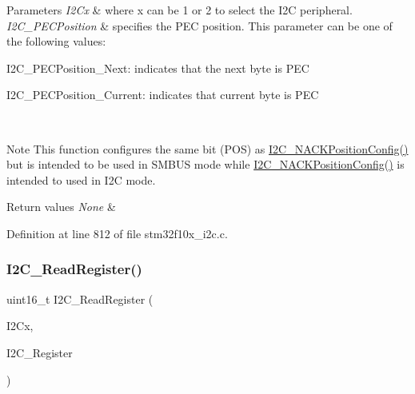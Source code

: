 \begin{DoxyParams}{Parameters}
{\em I2\+Cx} & where x can be 1 or 2 to select the I2C peripheral. \\
\hline
{\em I2\+C\+\_\+\+P\+E\+C\+Position} & specifies the P\+EC position. This parameter can be one of the following values\+: \begin{DoxyItemize}
\item I2\+C\+\_\+\+P\+E\+C\+Position\+\_\+\+Next\+: indicates that the next byte is P\+EC \item I2\+C\+\_\+\+P\+E\+C\+Position\+\_\+\+Current\+: indicates that current byte is P\+EC\end{DoxyItemize}
\\
\hline
\end{DoxyParams}
\begin{DoxyNote}{Note}
This function configures the same bit (P\+OS) as \hyperlink{group___i2_c___private___functions_gad08ebffc3a234d84e6405ec115bd74f1}{I2\+C\+\_\+\+N\+A\+C\+K\+Position\+Config()} but is intended to be used in S\+M\+B\+US mode while \hyperlink{group___i2_c___private___functions_gad08ebffc3a234d84e6405ec115bd74f1}{I2\+C\+\_\+\+N\+A\+C\+K\+Position\+Config()} is intended to used in I2C mode.
\end{DoxyNote}

\begin{DoxyRetVals}{Return values}
{\em None} & \\
\hline
\end{DoxyRetVals}


Definition at line 812 of file stm32f10x\+\_\+i2c.\+c.

\mbox{\label{group___i2_c___private___functions_ga8021dc796d15f997356b0583d6346805}} 
\subsubsection{\texorpdfstring{I2\+C\+\_\+\+Read\+Register()}{I2C\_ReadRegister()}}
{\footnotesize\ttfamily uint16\+\_\+t I2\+C\+\_\+\+Read\+Register (\begin{DoxyParamCaption}\item[{\hyperlink{struct_i2_c___type_def}{I2\+C\+\_\+\+Type\+Def} $\ast$}]{I2\+Cx,  }\item[{uint8\+\_\+t}]{I2\+C\+\_\+\+Register }\end{DoxyParamCaption})}



